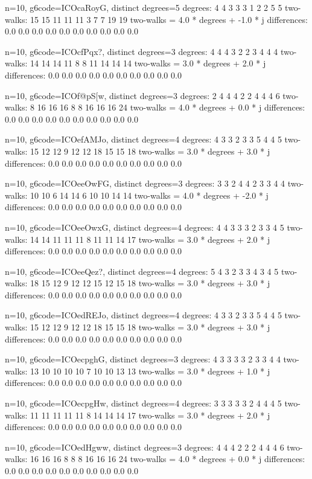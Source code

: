 {{{{{{{{{{{{{{{{{n=10, g6code=ICOcaRoyG, distinct degrees=5
degrees: 4 4 3 3 3 1 2 2 5 5 
two-walks: 15 15 11 11 11 3 7 7 19 19 
two-walks = 4.0 * degrees + -1.0 * j
differences: 0.0 0.0 0.0 0.0 0.0 0.0 0.0 0.0 0.0 0.0 

n=10, g6code=ICOcfPqx?, distinct degrees=3
degrees: 4 4 4 3 2 2 3 4 4 4 
two-walks: 14 14 14 11 8 8 11 14 14 14 
two-walks = 3.0 * degrees + 2.0 * j
differences: 0.0 0.0 0.0 0.0 0.0 0.0 0.0 0.0 0.0 0.0 

n=10, g6code=ICOf@pS[w, distinct degrees=3
degrees: 2 4 4 4 2 2 4 4 4 6 
two-walks: 8 16 16 16 8 8 16 16 16 24 
two-walks = 4.0 * degrees + 0.0 * j
differences: 0.0 0.0 0.0 0.0 0.0 0.0 0.0 0.0 0.0 0.0 

n=10, g6code=ICOefAMJo, distinct degrees=4
degrees: 4 3 3 2 3 3 5 4 4 5 
two-walks: 15 12 12 9 12 12 18 15 15 18 
two-walks = 3.0 * degrees + 3.0 * j
differences: 0.0 0.0 0.0 0.0 0.0 0.0 0.0 0.0 0.0 0.0 

n=10, g6code=ICOeeOwFG, distinct degrees=3
degrees: 3 3 2 4 4 2 3 3 4 4 
two-walks: 10 10 6 14 14 6 10 10 14 14 
two-walks = 4.0 * degrees + -2.0 * j
differences: 0.0 0.0 0.0 0.0 0.0 0.0 0.0 0.0 0.0 0.0 

n=10, g6code=ICOeeOwxG, distinct degrees=4
degrees: 4 4 3 3 3 2 3 3 4 5 
two-walks: 14 14 11 11 11 8 11 11 14 17 
two-walks = 3.0 * degrees + 2.0 * j
differences: 0.0 0.0 0.0 0.0 0.0 0.0 0.0 0.0 0.0 0.0 

n=10, g6code=ICOeeQez?, distinct degrees=4
degrees: 5 4 3 2 3 3 4 3 4 5 
two-walks: 18 15 12 9 12 12 15 12 15 18 
two-walks = 3.0 * degrees + 3.0 * j
differences: 0.0 0.0 0.0 0.0 0.0 0.0 0.0 0.0 0.0 0.0 

n=10, g6code=ICOedREJo, distinct degrees=4
degrees: 4 3 3 2 3 3 5 4 4 5 
two-walks: 15 12 12 9 12 12 18 15 15 18 
two-walks = 3.0 * degrees + 3.0 * j
differences: 0.0 0.0 0.0 0.0 0.0 0.0 0.0 0.0 0.0 0.0 

n=10, g6code=ICOecpghG, distinct degrees=3
degrees: 4 3 3 3 3 2 3 3 4 4 
two-walks: 13 10 10 10 10 7 10 10 13 13 
two-walks = 3.0 * degrees + 1.0 * j
differences: 0.0 0.0 0.0 0.0 0.0 0.0 0.0 0.0 0.0 0.0 

n=10, g6code=ICOecpgHw, distinct degrees=4
degrees: 3 3 3 3 3 2 4 4 4 5 
two-walks: 11 11 11 11 11 8 14 14 14 17 
two-walks = 3.0 * degrees + 2.0 * j
differences: 0.0 0.0 0.0 0.0 0.0 0.0 0.0 0.0 0.0 0.0 

n=10, g6code=ICOedHgww, distinct degrees=3
degrees: 4 4 4 2 2 2 4 4 4 6 
two-walks: 16 16 16 8 8 8 16 16 16 24 
two-walks = 4.0 * degrees + 0.0 * j
differences: 0.0 0.0 0.0 0.0 0.0 0.0 0.0 0.0 0.0 0.0 

}}}}}}}}}}}}}}}}}
